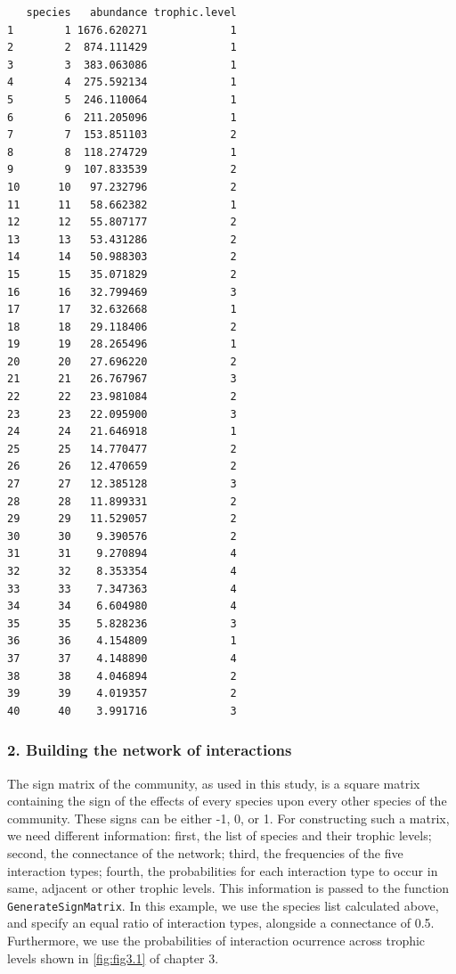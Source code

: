 \begin{verbatim}
   species   abundance trophic.level
1        1 1676.620271             1
2        2  874.111429             1
3        3  383.063086             1
4        4  275.592134             1
5        5  246.110064             1
6        6  211.205096             1
7        7  153.851103             2
8        8  118.274729             1
9        9  107.833539             2
10      10   97.232796             2
11      11   58.662382             1
12      12   55.807177             2
13      13   53.431286             2
14      14   50.988303             2
15      15   35.071829             2
16      16   32.799469             3
17      17   32.632668             1
18      18   29.118406             2
19      19   28.265496             1
20      20   27.696220             2
21      21   26.767967             3
22      22   23.981084             2
23      23   22.095900             3
24      24   21.646918             1
25      25   14.770477             2
26      26   12.470659             2
27      27   12.385128             3
28      28   11.899331             2
29      29   11.529057             2
30      30    9.390576             2
31      31    9.270894             4
32      32    8.353354             4
33      33    7.347363             4
34      34    6.604980             4
35      35    5.828236             3
36      36    4.154809             1
37      37    4.148890             4
38      38    4.046894             2
39      39    4.019357             2
40      40    3.991716             3
\end{verbatim}

\normalsize

\subsubsection*{2. Building the network of interactions}\label{building-the-network-of-interactions}

The sign matrix of the community, as used in this study, is a square matrix containing the sign of the effects of every species upon every other species of the community. These signs can be either -1, 0, or 1. For constructing such a matrix, we need different information: first, the list of species and their trophic levels; second, the connectance of the network; third, the frequencies of the five interaction types; fourth, the probabilities for each interaction type to occur in same, adjacent or other trophic levels. This information is passed to the function \texttt{GenerateSignMatrix}. In this example, we use the species list calculated above, and specify an equal ratio of interaction types, alongside a connectance of 0.5. Furthermore, we use the probabilities of interaction ocurrence across trophic levels shown in \cref{fig:fig3.1} of chapter 3.

